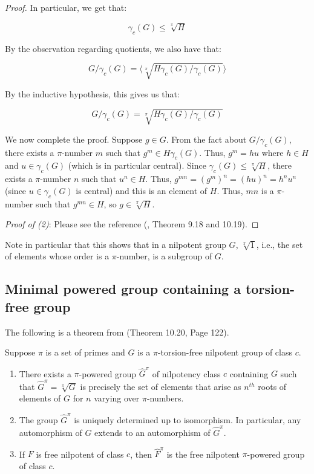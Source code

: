 \begin{proof}
  In particular, we get that:

  $$\gamma_c(G) \le \sqrt[\pi]{H}$$

  By the observation regarding quotients, we also have that:

  $$G/\gamma_c(G) = \langle \sqrt[\pi]{H\gamma_c(G)/\gamma_c(G)} \rangle$$

  By the inductive hypothesis, this gives us that:

  $$G/\gamma_c(G) = \sqrt[\pi]{H\gamma_c(G)/\gamma_c(G)}$$

  We now complete the proof. Suppose $g \in G$. From the fact about
  $G/\gamma_c(G)$, there exists a $\pi$-number $m$ such that $g^m \in
  H\gamma_c(G)$. Thus, $g^m = hu$ where $h \in H$ and $u \in
  \gamma_c(G)$ (which is in particular central). Since $\gamma_c(G)
  \le \sqrt[\pi]{H}$, there exists a $\pi$-number $n$ such that $u^n
  \in H$. Thus, $g^{mn} = (g^m)^n = (hu)^n = h^nu^n$ (since $u \in \gamma_c(G)$ is
  central) and this is an element of $H$. Thus, $mn$ is a $\pi$-number
  such that $g^{mn} \in H$, so $g \in \sqrt[\pi]{H}$.

  {\em Proof of (2)}: Please see the reference (\cite{Khukhro},
  Theorem 9.18 and 10.19). %
\end{proof}

Note in particular that this shows that in a nilpotent group $G$,
$\sqrt[\pi]{1}$, i.e., the set of elements whose order is a
$\pi$-number, is a subgroup of $G$.

\subsection{Minimal powered group containing a torsion-free group}\label{sec:minimal-powered}

The following is a theorem from \cite{Khukhro} (Theorem 10.20, Page
122). %

\begin{theorem}\label{thm:pi-powered-envelope}
  Suppose $\pi$ is a set of primes and $G$ is a $\pi$-torsion-free
  nilpotent group of class $c$.

  \begin{enumerate}
  \item There exists a $\pi$-powered group $\hat{G}^\pi$ of nilpotency
    class $c$ containing $G$ such that $\hat{G}^\pi = \sqrt[\pi]{G}$ is
    precisely the set of elements that arise as $n^{th}$ roots of
    elements of $G$ for $n$ varying over $\pi$-numbers.
  \item The group $\hat{G}^\pi$ is uniquely determined up to
    isomorphism. In particular, any automorphism of $G$ extends to an
    automorphism of $\hat{G}^\pi$.
  \item If $F$ is free nilpotent of class $c$, then $\hat{F}^\pi$ is
    the free nilpotent $\pi$-powered group of class $c$.
  \end{enumerate}
\end{theorem}

